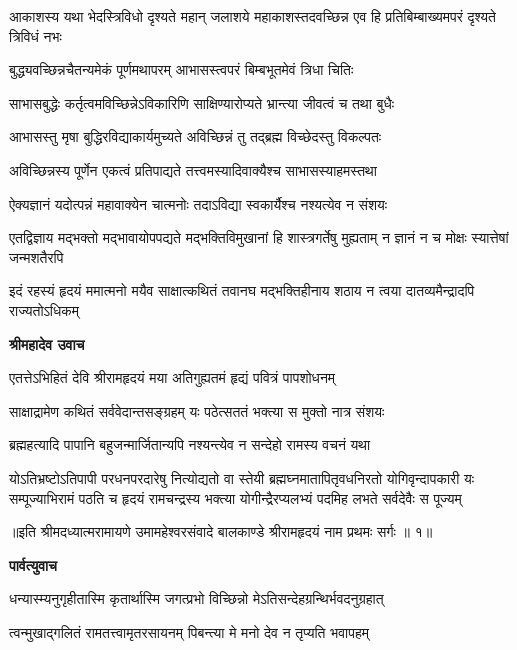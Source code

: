 \threelineshloka
{आकाशस्य यथा भेदस्त्रिविधो दृश्यते महान्}
{जलाशये महाकाशस्तदवच्छिन्न एव हि}
{प्रतिबिम्बाख्यमपरं दृश्यते त्रिविधं नभः} %

\twolineshloka
{बुद्ध्यवच्छिन्नचैतन्यमेकं पूर्णमथापरम्}
{आभासस्त्वपरं बिम्बभूतमेवं त्रिधा चितिः} %

\twolineshloka
{साभासबुद्धेः कर्तृत्वमविच्छिन्नेऽविकारिणि}
{साक्षिण्यारोप्यते भ्रान्त्या जीवत्वं च तथा बुधैः} %

\twolineshloka
{आभासस्तु मृषा बुद्धिरविद्याकार्यमुच्यते}
{अविच्छिन्नं तु तद्ब्रह्म विच्छेदस्तु विकल्पतः} %

\twolineshloka
{अविच्छिन्नस्य पूर्णेन एकत्वं प्रतिपाद्यते}
{तत्त्वमस्यादिवाक्यैश्च साभासस्याहमस्तथा} %

\twolineshloka
{ऐक्यज्ञानं यदोत्पन्नं महावाक्येन चात्मनोः}
{तदाऽविद्या स्वकार्यैश्च नश्यत्येव न संशयः} %

\threelineshloka
{एतद्विज्ञाय मद्भक्तो मद्भावायोपपद्यते}
{मद्भक्तिविमुखानां हि शास्त्रगर्तेषु मुह्यताम्}
{न ज्ञानं न च मोक्षः स्यात्तेषां जन्मशतैरपि} %

\fourlineindentedshloka
{इदं रहस्यं हृदयं ममात्मनो}
{मयैव साक्षात्कथितं तवानघ}
{मद्भक्तिहीनाय शठाय न त्वया}
{दातव्यमैन्द्रादपि राज्यतोऽधिकम्} %

\textbf{श्रीमहादेव उवाच}

\twolineshloka
{एतत्तेऽभिहितं देवि श्रीरामहृदयं मया}
{अतिगुह्यतमं हृद्यं पवित्रं पापशोधनम्} %

\twolineshloka
{साक्षाद्रामेण कथितं सर्ववेदान्तसङ्ग्रहम्}
{यः पठेत्सततं भक्त्या स मुक्तो नात्र संशयः} %

\twolineshloka
{ब्रह्महत्यादि पापानि बहुजन्मार्जितान्यपि}
{नश्यन्त्येव न सन्देहो रामस्य वचनं यथा} %

\fourlineindentedshloka
{योऽतिभ्रष्टोऽतिपापी परधनपरदारेषु नित्योद्यतो वा}
{स्तेयी ब्रह्मघ्नमातापितृवधनिरतो योगिवृन्दापकारी}
{यः सम्पूज्याभिरामं पठति च हृदयं रामचन्द्रस्य भक्त्या}
{योगीन्द्रैरप्यलभ्यं पदमिह लभते सर्वदेवैः स पूज्यम्} %

{॥इति श्रीमदध्यात्मरामायणे उमामहेश्वरसंवादे बालकाण्डे
श्रीरामहृदयं नाम प्रथमः सर्गः ॥ १॥
}




\textbf{पार्वत्युवाच}

\twolineshloka
{धन्यास्म्यनुगृहीतास्मि कृतार्थास्मि जगत्प्रभो}
{विच्छिन्नो मेऽतिसन्देहग्रन्थिर्भवदनुग्रहात्} %

\twolineshloka
{त्वन्मुखाद्गलितं रामतत्त्वामृतरसायनम्}
{पिबन्त्या मे मनो देव न तृप्यति भवापहम्} %

